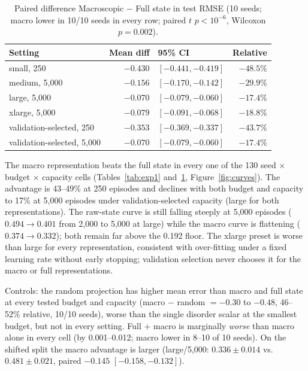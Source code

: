 \documentclass[11pt,a4paper]{article}
\begin{document}
\begin{table}[t]
\centering
\caption{Paired difference Macroscopic $-$ Full state in test RMSE (10 seeds;
macro lower in 10/10 seeds in every row; paired $t$ $p<10^{-6}$, Wilcoxon
$p=0.002$).}
\label{tab:paired}
\begin{tabular}{lrlr}
\toprule
Setting & Mean diff & 95\% CI & Relative\\
\midrule
small, 250 & $-0.430$ & $[-0.441,-0.419]$ & $-48.5\%$\\
medium, 5,000 & $-0.156$ & $[-0.170,-0.142]$ & $-29.9\%$\\
large, 5,000 & $-0.070$ & $[-0.079,-0.060]$ & $-17.4\%$\\
xlarge, 5,000 & $-0.079$ & $[-0.091,-0.068]$ & $-18.8\%$\\
validation-selected, 250 & $-0.353$ & $[-0.369,-0.337]$ & $-43.7\%$\\
validation-selected, 5,000 & $-0.070$ & $[-0.079,-0.060]$ & $-17.4\%$\\
\bottomrule
\end{tabular}
\end{table}

The macro representation beats the full state in every one of the 130 seed
$\times$ budget $\times$ capacity cells (Tables~\ref{tab:exp1}
and~\ref{tab:paired}, Figure~\ref{fig:curves}). The advantage is 43--49\% at
250 episodes and declines with both budget and capacity to 17\% at 5,000
episodes under validation-selected capacity (large for both representations).
The raw-state curve is still falling steeply at 5,000 episodes ($0.494\to0.401$
from 2,000 to 5,000 at large) while the macro curve is flattening
($0.374\to0.332$); both remain far above the 0.192 floor. The xlarge preset is
worse than large for every representation, consistent with over-fitting under a
fixed learning rate without early stopping; validation selection never chooses
it for the macro or full representations.

Controls: the random projection has higher mean error than macro and full state
at every tested budget and capacity (macro $-$ random $=-0.30$ to $-0.48$, 46--52\% relative, 10/10
seeds), worse than the single disorder scalar at the smallest budget, but not in
every setting. Full + macro
is marginally \emph{worse} than macro alone in every cell (by 0.001--0.012;
macro lower in 8--10 of 10 seeds). On the shifted split the macro advantage is
larger (large/5,000: $0.336\pm0.014$ vs.\ $0.481\pm0.021$, paired $-0.145$
$[-0.158,-0.132]$).
\end{document}
